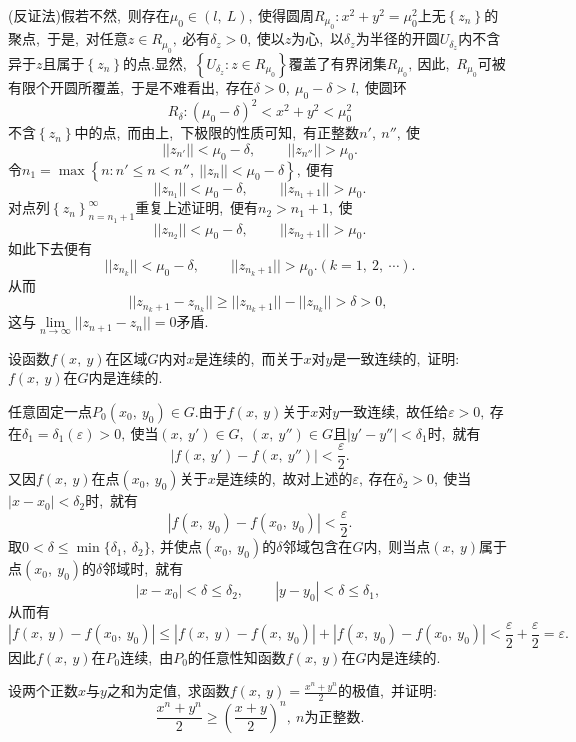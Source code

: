 	\begin{solution}
		(反证法)假若不然,\ 则存在$\mu_0\in\left(l,\ L\right),\ $使得圆周$R_{\mu_0}:x^2+y^2=\mu_0^2$上无$\left\{z_n\right\}$的聚点,\ 于是,\ 对任意$z\in R_{\mu_0},\ $必有$\delta_z>0,\ $使以$z$为心,\ 以$\delta_z$为半径的开圆$U_{\delta_z}$内不含异于$z$且属于$\left\{z_n\right\}$的点.显然,\ $\left\{U_{\delta_z}:z\in R_{\mu_0}\right\}$覆盖了有界闭集$R_{\mu_0},\ $因此,\ $R_{\mu_0}$可被有限个开圆所覆盖,\ 于是不难看出,\ 存在$\delta>0,\ \mu_0-\delta>l,\ $使圆环
		$$R_\delta:(\mu_0-\delta)^2<x^2+y^2<\mu_0^2$$
		不含$\left\{z_n\right\}$中的点,\ 而由上,\ 下极限的性质可知,\ 有正整数$n',\ n'',\ $使
		$$||z_{n'}||<\mu_0-\delta,\ \qquad||z_{n''}||>\mu_0.$$
		令$n_1=\max\left\{n:n'\le n<n'',\ ||z_n||<\mu_0-\delta\right\},\ $便有
		$$||z_{n_1}||<\mu_0-\delta,\ \qquad||z_{n_1+1}||>\mu_0.$$
		对点列$\left\{z_n\right\}_{n=n_1+1}^\infty$重复上述证明,\ 便有$n_2>n_1+1,\ $使
		$$||z_{n_2}||<\mu_0-\delta,\ \qquad||z_{n_2+1}||>\mu_0.$$
		如此下去便有
		$$||z_{n_k}||<\mu_0-\delta,\ \qquad||z_{n_k+1}||>\mu_0.(k=1,\ 2,\ \cdots).$$
		从而
		$$||z_{n_k+1}-z_{n_k}||\ge||z_{n_k+1}||-||z_{n_k}||>\delta>0,\ $$
		这与$\lim\limits_{n\rightarrow\infty}||z_{n+1}-z_n||=0$矛盾. 
	\end{solution}
	\newpage
	\begin{problem}
		设函数$f(x,\ y)$在区域$G$内对$x$是连续的,\ 而关于$x$对$y$是一致连续的,\ 证明:$f(x,\ y)$在$G$内是连续的.
	\end{problem}
	
	\begin{solution}
		任意固定一点$P_0(x_0,\ y_0)\in G.$由于$f(x,\ y)$关于$x$对$y$一致连续,\ 故任给$\varepsilon>0,\ $存在$\delta_1=\delta_1(\varepsilon)>0,\ $使当$(x,\ y')\in G,\ (x,\ y'')\in G$且$|y'-y''|<\delta_1$时,\ 就有
		$$|f(x,\ y')-f(x,\ y'')|<\frac{\varepsilon}{2}.$$
		又因$f(x,\ y)$在点$(x_0,\ y_0)$关于$x$是连续的,\ 故对上述的$\varepsilon,\ $存在$\delta_2>0,\ $使当$|x-x_0|<\delta_2$时,\ 就有
		$$|f(x,\ y_0)-f(x_0,\ y_0)|<\frac{\varepsilon}{2}.$$
		取$0<\delta\le\min\{\delta_1,\ \delta_2\},\ $并使点$(x_0,\ y_0)$的$\delta$邻域包含在$G$内,\ 则当点$(x,\ y)$属于点$(x_0,\ y_0)$的$\delta$邻域时,\ 就有
		$$|x-x_0|<\delta\le\delta_2,\ \qquad|y-y_0|<\delta\le\delta_1,\ $$
		从而有
		$$|f(x,\ y)-f(x_0,\ y_0)|\le|f(x,\ y)-f(x,\ y_0)|+|f(x,\ y_0)-f(x_0,\ y_0)|<\frac{\varepsilon}{2}+\frac{\varepsilon}{2}=\varepsilon.$$
		因此$f(x,\ y)$在$P_0$连续,\ 由$P_0$的任意性知函数$f(x,\ y)$在$G$内是连续的. 
	\end{solution}
	\newpage
	\begin{problem}
		设两个正数$x$与$y$之和为定值,\ 求函数$f(x,\ y)=\frac{x^n+y^n}{2}$的极值,\ 并证明:
		$$\frac{x^n+y^n}{2}\ge\left(\frac{x+y}{2}\right)^n,\ n\text{为正整数}.$$
	\end{problem}
	
